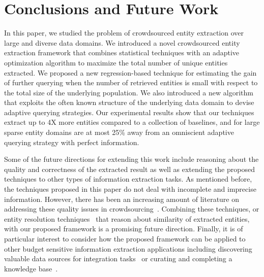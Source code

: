 
\section{Conclusions and Future Work}
\label{sec:conclusions}
In this paper, we studied the problem of crowdsourced entity extraction over large and diverse data domains. We introduced a novel crowdsourced entity extraction framework that combines statistical techniques with an adaptive optimization algorithm to maximize the total number of unique entities extracted. We proposed a new regression-based technique for estimating the gain of further querying when the number of retrieved entities is small with respect to the total size of the underlying population. We also introduced a new algorithm that exploits the often known structure of the underlying data domain to devise adaptive querying strategies. Our experimental results show that our techniques extract up to 4X more entities compared to a collection of baselines, and for large sparse entity domains are at most 25\% away from an omniscient adaptive querying strategy with perfect information.

Some of the future directions for extending this work include reasoning about the quality and correctness of the extracted result as well as extending the proposed techniques to other types of information extraction tasks. As mentioned before, the techniques proposed in this paper do not deal with incomplete and imprecise information. However, there has been an increasing amount of literature on addressing these quality issues in crowdsourcing~\cite{ vox-populii, quality, nushi:14, raykar-whom-to-trust}. Combining these techniques, or entity resolution techniques~\cite{crowder} that reason about similarity of extracted entities, with our proposed framework is a promising future direction. Finally, it is of particular interest to consider how the proposed framework can be applied to other budget sensitive information extraction applications including discovering valuable data sources for integration tasks~\cite{rekatsinas:2015} or curating and completing a knowledge base~\cite{kondredi:2014}.